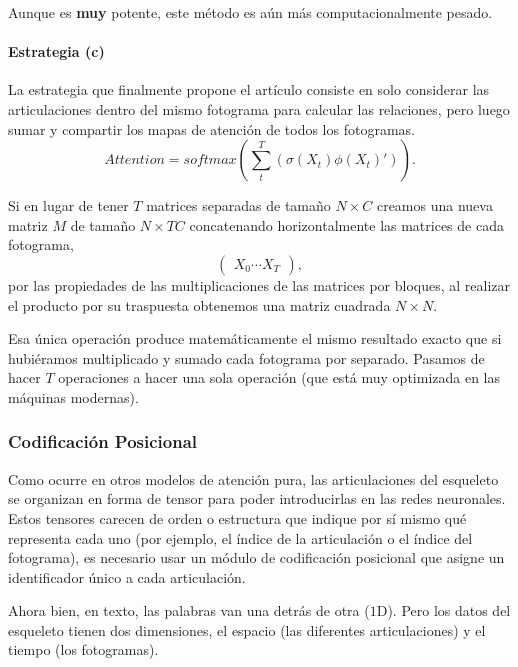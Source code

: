 Aunque es \textbf{muy} potente, este método es aún más computacionalmente pesado.

\paragraph{Estrategia (c)}\hypertarget{est:c}{} La estrategia que finalmente propone el artículo consiste en solo considerar las articulaciones dentro del mismo fotograma para calcular las relaciones, pero luego sumar y compartir los mapas de atención de todos los fotogramas.
\begin{equation*}
Attention = softmax(\sum_t^T(\sigma(X_t)\phi(X_t)')).
\end{equation*}

Si en lugar de tener $T$ matrices separadas de tamaño $N\times C$ creamos una nueva matriz $M$ de tamaño $N\times TC$ concatenando horizontalmente las matrices de cada fotograma,
\begin{equation*}
\begin{pmatrix}
X_0 \cdots X_T
\end{pmatrix},
\end{equation*}
por las propiedades de las multiplicaciones de las matrices por bloques, al realizar el producto por su traspuesta obtenemos una matriz cuadrada $N\times N$.

Esa única operación produce matemáticamente el mismo resultado exacto que si hubiéramos multiplicado y sumado cada fotograma por separado. Pasamos de hacer $T$ operaciones a hacer una sola operación (que está muy optimizada en las máquinas modernas).


\subsubsection{Codificación Posicional}
Como ocurre en otros modelos de atención pura, las articulaciones del esqueleto se organizan en forma de tensor para poder introducirlas en las redes neuronales.
Estos tensores carecen de orden o estructura que indique por sí mismo qué representa cada uno (por ejemplo, el índice de la articulación o el índice del fotograma), es necesario usar un módulo de codificación posicional que asigne un identificador único a cada articulación.

Ahora bien, en texto, las palabras van una detrás de otra ($1$D).
Pero los datos del esqueleto tienen dos dimensiones, el espacio (las diferentes articulaciones) y el tiempo (los fotogramas).

